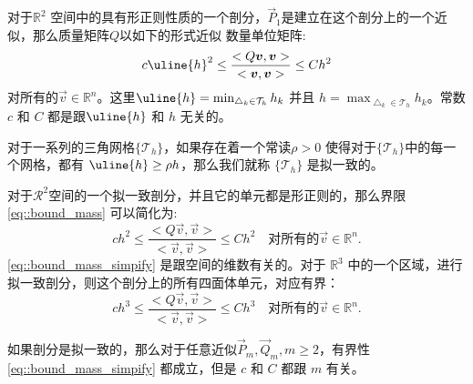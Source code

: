         \begin{proposition}
            \label{pro::bound_mass} 对于$\mathbb{R}^2$ 空间中的具有形正则性质的一个剖分，$\vec{P}_1$是建立在这个剖分上的一个近似，那么质量矩阵$Q$以如下的形式近似
            数量单位矩阵:
            \begin{equation}
                c\uline{h}^2 \leq \frac{<Q\vec{v}, \vec{v}>}{<\vec{v}, \vec{v}>} \leq Ch^2
                \label{eq::bound_mass}
            \end{equation}
            对所有的$\vec{v} \in \mathbb{R}^n$。这里$\uline{h} = \min_{\bigtriangleup_k \in \mathcal{T}_h} h_k$ 并且 $h = \max_{\bigtriangleup_k \in \mathcal{T}_h} h_k$。常数$c$ 和 $C$ 都是跟$\uline{h}$ 和 $h$ 无关的。
        \end{proposition}

        \begin{definition}[拟一致剖分]
            \label{theo_quasi_uni_subd}对于一系列的三角网格$\{\mathcal{T}_h\}$，如果存在着一个常读$\rho > 0$ 使得对于$\{\mathcal{T}_h\}$中的每一个网格，都有 $\uline{h} \geq \rho h$，那么我们就称 $\{\mathcal{T}_h\}$ 是拟一致的。
        \end{definition}

        对于$\mathcal{R}^2$空间的一个拟一致剖分，并且它的单元都是形正则的，那么界限 \eqref{eq::bound_mass} 可以简化为:
        \begin{equation}
            c h^2 \leq \frac{<Q \vec{v}, \vec{v}>}{<\vec{v}, \vec{v}>} \leq C h^2 \quad \mbox{对所有的} \vec{v} \in \mathbb{R}^n.
            \label{eq::bound_mass_simpify}
        \end{equation}
        \eqref{eq::bound_mass_simpify} 是跟空间的维数有关的。对于 $\mathbb{R}^3$ 中的一个区域，进行拟一致剖分，则这个剖分上的所有四面体单元，对应有界：
        \begin{equation}
            c h^3 \leq \frac{<Q \vec{v}, \vec{v}>}{<\vec{v}, \vec{v}>} \leq C h^3 \quad \mbox{对所有的} \vec{v} \in \mathbb{R}^n.
            \label{eq::bound_mass_R3}
        \end{equation}

        \begin{remark}
            如果剖分是拟一致的，那么对于任意近似$\vec{P}_m, \vec{Q}_m, m \geq 2$，有界性 \eqref{eq::bound_mass_simpify} 都成立，但是 $c$ 和 $C$ 都跟 $m$ 有关。
        \end{remark}


